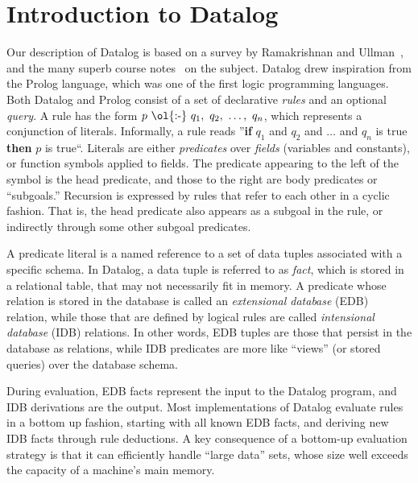 \section{Introduction to Datalog}
\label{ch:p2:sec:datalog}

Our description of Datalog is based on a survey by Ramakrishnan and
Ullman~\cite{deductive-database}, and the many superb course
notes~\cite{ullmanNotes} on the subject.  Datalog drew inspiration from the
Prolog language, which was one of the first logic programming languages.  Both
Datalog and Prolog consist of a set of declarative {\em rules} and an optional
{\em query}.  A rule has the form $p\ \text{\ol{:-}}\ q_1,\ q_2,\ \ldots,\
q_n$, which represents a conjunction of literals.  Informally, a rule reads
''{\bf if} $q_1$ and $q_2$ and $\ldots$ and $q_n$ is true {\bf then} $p$ is
true``.  Literals are either {\em predicates} over {\em fields} (variables and
constants), or function symbols applied to fields.  The predicate appearing to
the left of the \ol{:-} symbol is the head predicate, and those to the right
are body predicates or ``subgoals.'' Recursion is expressed by rules that refer
to each other in a cyclic fashion.  That is, the head predicate also appears as
a subgoal in the rule, or indirectly through some other subgoal predicates.

A predicate literal is a named reference to a set of data tuples associated
with a specific schema.  In Datalog, a data tuple is referred to as {\em fact},
which is stored in a relational table, that may not necessarily fit in memory.
A predicate whose relation is stored in the database is called an {\em
extensional database} (EDB) relation, while those that are defined by logical
rules are called {\em intensional database} (IDB) relations.  In other words,
EDB tuples are those that persist in the database as relations, while IDB
predicates are more like ``views'' (or stored queries) over the database
schema.

During evaluation, EDB facts represent the input to the Datalog program, and
IDB derivations are the output.  Most implementations of Datalog evaluate rules
in a bottom up fashion, starting with all known EDB facts, and deriving new IDB
facts through rule deductions.  A key consequence of a bottom-up evaluation
strategy is that it can efficiently handle ``large data'' sets, whose size well
exceeds the capacity of a machine's main memory.  


